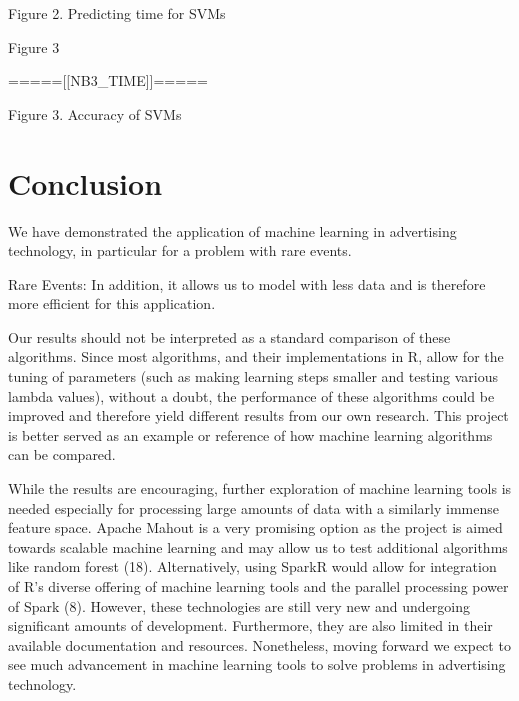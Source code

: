 \documentclass[a4paper]{article}
\begin{document}
\begin{multicols}{2}
\begin{center}
Figure 2. Predicting time for SVMs
\end{center}

Figure 3
\begin{Schunk}
\end{Schunk}
\begin{center}
=====[[NB3\_TIME]]=====

Figure 3. Accuracy of SVMs
\end{center}













\section*{Conclusion}
We have demonstrated the application of machine learning in advertising technology, in particular for a problem with rare events. 


Rare Events: In addition, it allows us to model with less data and is therefore more efficient for this application.


Our results should not be interpreted as a standard comparison of these algorithms. Since most algorithms, and their implementations in R, allow for the tuning of parameters (such as making learning steps smaller and testing various lambda values), without a doubt, the performance of these algorithms could be improved and therefore yield different results from our own research. This project is better served as an example or reference of how machine learning algorithms can be compared.

While the results are encouraging, further exploration of machine learning tools is needed especially for processing large amounts of data with a similarly immense feature space. Apache Mahout is a very promising option as the project is aimed towards scalable machine learning and may allow us to test additional algorithms like random forest (18). Alternatively, using SparkR would allow for integration of R's diverse offering of machine learning tools and the parallel processing power of Spark (8). However, these technologies are still very new and undergoing significant amounts of development. Furthermore, they are also limited in their available documentation and resources. Nonetheless, moving forward we expect to see much advancement in machine learning tools to solve problems in advertising technology.


\end{multicols}
\end{document}
